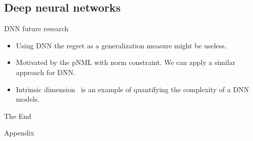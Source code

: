 \documentclass[aspectratio=169]{beamer}
\newcommand{\backupbegin}{
   \newcounter{finalframe}
   \setcounter{finalframe}{\value{framenumber}}
}
\begin{document}
\subsection{Deep neural networks}
\begin{frame}{DNN future research}
\begin{itemize}
\setlength\itemsep{2em}
\item Using DNN the regret as a generalization measure might be useless.
\item Motivated by the pNML with norm constraint. We can apply a similar approach for DNN. 
\item Intrinsic dimension~ is an example of quantifying the complexity of a DNN models.
\end{itemize}
\end{frame}



\begin{frame}
\Huge{\centerline{The End}}
\end{frame}


\backupbegin
\begin{frame}[c]
\begin{center}
\Huge Appendix
\end{center}
\end{frame}
\end{document}
